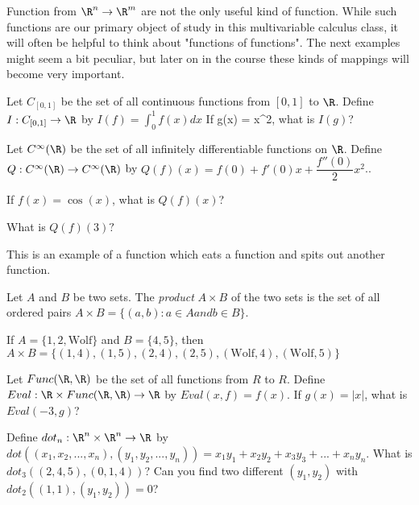 Function from $\R^n \to \R^m$ are not the only useful kind of function.  While such functions are our primary object of study in 
this multivariable calculus class,  it will often be helpful to think about "functions of functions".  The next examples might seem a 
bit peculiar, but later on in the course these kinds of mappings will become very important.

\begin{question}
Let $C_{[0,1]}$ be the set of all continuous functions from $[0,1]$ to $\R$.  Define $I:C_{[0,1]} \to \R$ by $I(f) = \displaystyle \int_0^1 f(x)dx$ 
If g(x)  = x^2, what is $I(g)$?
\end{question}

\begin{question}
Let $C^{\infty}(\R)$ be the set of all infinitely differentiable functions on $\R$.  Define $Q: C^{\infty}(\R) \to C^{\infty}(\R)$ by $Q(f)(x) = f(0)+f'(0)x+\dfrac{f''(0)}{2}x^2$..

If $f(x) = \cos(x)$, what is $Q(f)(x)$?

What is $Q(f)(3)?$

This is an example of a function which eats a function and spits out another function.
\end{question}

\begin{definition}
	Let $A$ and $B$ be two sets.  The \textit{product}  $A\times B$ of the two sets is the set of all ordered pairs $A \times B = \{ (a,b): a \in A and b \in B\}$.
\end{definition}

\begin{example}
	If $A = \{ 1,2,\text{Wolf}\}$  and $B = \{4,5\}$, then $A \times B = \{(1,4),(1,5),(2,4),(2,5),(\text{Wolf},4),(\text{Wolf},5)\}$
\end{example}

\begin{question}
Let $Func(\R,\R)$ be the set of all functions from $R$ to $R$.  Define $Eval: \R \times Func(\R,\R) \to \R$ by $Eval(x,f) = f(x)$.
If $g(x) = |x|$, what is $Eval(-3,g)$?
\end{question}

\begin{question}
Define $dot_n:\R^n \times \R^n \to \R$ by $dot((x_1,x_2,...,x_n),(y_1,y_2,...,y_n))=x_1y_1+x_2y_2+x_3y_3+...+x_ny_n$.  What is $dot_3((2,4,5),(0,1,4))$?
Can you find  two different $(y_1,y_2)$ with $dot_2((1,1),(y_1,y_2))=0$?
\end{question}

